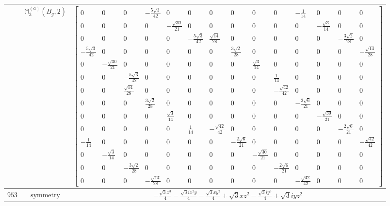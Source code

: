 \documentclass[fleqn,8pt,landscape]{jsarticle}
\begin{document}
\begin{longtable}{ccc}
$  $ & $ \mathbb{M}_{3}^{(a)}(B_{g},2) $ & $ \begin{bmatrix} 0 & 0 & 0 & - \frac{5 \sqrt{3}}{42} & 0 & 0 & 0 & 0 & 0 & 0 & - \frac{1}{14} & 0 & 0 & 0 \\ 0 & 0 & 0 & 0 & - \frac{\sqrt{30}}{21} & 0 & 0 & 0 & 0 & 0 & 0 & - \frac{\sqrt{3}}{14} & 0 & 0 \\ 0 & 0 & 0 & 0 & 0 & - \frac{5 \sqrt{3}}{42} & \frac{\sqrt{14}}{28} & 0 & 0 & 0 & 0 & 0 & - \frac{3 \sqrt{2}}{28} & 0 \\ - \frac{5 \sqrt{3}}{42} & 0 & 0 & 0 & 0 & 0 & 0 & \frac{3 \sqrt{2}}{28} & 0 & 0 & 0 & 0 & 0 & - \frac{\sqrt{14}}{28} \\ 0 & - \frac{\sqrt{30}}{21} & 0 & 0 & 0 & 0 & 0 & 0 & \frac{\sqrt{3}}{14} & 0 & 0 & 0 & 0 & 0 \\ 0 & 0 & - \frac{5 \sqrt{3}}{42} & 0 & 0 & 0 & 0 & 0 & 0 & \frac{1}{14} & 0 & 0 & 0 & 0 \\ 0 & 0 & \frac{\sqrt{14}}{28} & 0 & 0 & 0 & 0 & 0 & 0 & - \frac{\sqrt{42}}{42} & 0 & 0 & 0 & 0 \\ 0 & 0 & 0 & \frac{3 \sqrt{2}}{28} & 0 & 0 & 0 & 0 & 0 & 0 & - \frac{2 \sqrt{6}}{21} & 0 & 0 & 0 \\ 0 & 0 & 0 & 0 & \frac{\sqrt{3}}{14} & 0 & 0 & 0 & 0 & 0 & 0 & - \frac{\sqrt{30}}{21} & 0 & 0 \\ 0 & 0 & 0 & 0 & 0 & \frac{1}{14} & - \frac{\sqrt{42}}{42} & 0 & 0 & 0 & 0 & 0 & - \frac{2 \sqrt{6}}{21} & 0 \\ - \frac{1}{14} & 0 & 0 & 0 & 0 & 0 & 0 & - \frac{2 \sqrt{6}}{21} & 0 & 0 & 0 & 0 & 0 & - \frac{\sqrt{42}}{42} \\ 0 & - \frac{\sqrt{3}}{14} & 0 & 0 & 0 & 0 & 0 & 0 & - \frac{\sqrt{30}}{21} & 0 & 0 & 0 & 0 & 0 \\ 0 & 0 & - \frac{3 \sqrt{2}}{28} & 0 & 0 & 0 & 0 & 0 & 0 & - \frac{2 \sqrt{6}}{21} & 0 & 0 & 0 & 0 \\ 0 & 0 & 0 & - \frac{\sqrt{14}}{28} & 0 & 0 & 0 & 0 & 0 & 0 & - \frac{\sqrt{42}}{42} & 0 & 0 & 0 \end{bmatrix} $ \\ \hline
$ 953 $ & $ \text{symmetry} $ & $ - \frac{\sqrt{3} x^{3}}{4} - \frac{\sqrt{3} i x^{2} y}{4} - \frac{\sqrt{3} x y^{2}}{4} + \sqrt{3} x z^{2} - \frac{\sqrt{3} i y^{3}}{4} + \sqrt{3} i y z^{2} $ \\

\end{longtable}
\end{document}
